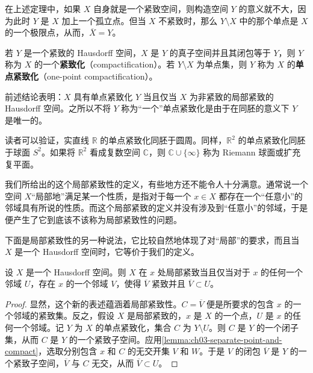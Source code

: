 在上述定理中，如果 $X$ 自身就是一个紧致空间，则构造空间 $Y$ 的意义就不大，因为此时 $Y$ 是 $X$ 加上一个孤立点。但当 $X$ 不紧致时，那么 $Y\setminus X$ 中的那个单点是 $X$ 的一个极限点，从而，$\overline{X}=Y$。

\begin{definition}\label{definition:ch03-compactification}
若 $Y$ 是一个紧致的 Hausdorff 空间，$X$ 是 $Y$ 的真子空间并且其闭包等于 $Y$，则 $Y$ 称为 $X$ 的一个\textbf{紧致化}（compactification）。若 $Y\setminus X$ 为单点集，则 $Y$ 称为 $X$ 的\textbf{单点紧致化}（one-point compactification）。
\end{definition}

前述结论表明：$X$ 具有单点紧致化 $Y$ 当且仅当 $X$ 为非紧致的局部紧致的 Hausdorff 空间。之所以不将 $Y$ 称为``一个''单点紧致化是由于在同胚的意义下 $Y$ 是唯一的。

\begin{example}\label{example:ch03-one-point-compact-examples}
读者可以验证，实直线 $\mathbb{R}$ 的单点紧致化同胚于圆周。同样，$\mathbb{R}^{2}$ 的单点紧致化同胚于球面 $S^{2}$。如果将 $\mathbb{R}^{2}$ 看成复数空间 $\mathbb{C}$，则 $\mathbb{C}\cup\{\infty\}$ 称为 Riemann 球面或扩充复平面。
\end{example}

我们所给出的这个局部紧致性的定义，有些地方还不能令人十分满意。通常说一个空间 $X$``局部地''满足某一个性质，是指对于每一个 $x\in X$ 都存在一个``任意小''的邻域具有所说的性质。而这个局部紧致的定义并没有涉及到``任意小''的邻域，于是便产生了它到底该不该称为局部紧致性的问题。

下面是局部紧致性的另一种说法，它比较自然地体现了对``局部''的要求，而且当 $X$ 是一个 Hausdorff 空间时，它等价于我们的定义。

\begin{theorem}\label{theorem:ch03-locally-compact-neighborhood}
设 $X$ 是一个 Hausdorff 空间。则 $X$ 在 $x$ 处局部紧致当且仅当对于 $x$ 的任何一个邻域 $U$，存在 $x$ 的一个邻域 $V$，使得 $\overline{V}$ 紧致并且 $\overline{V}\subset U$。
\end{theorem}

\begin{proof}
显然，这个新的表述蕴涵着局部紧致性。$C=\overline{V}$ 便是所要求的包含 $x$ 的一个邻域的紧致集。反之，假设 $X$ 是局部紧致的，$x$ 是 $X$ 的一个点，$U$ 是 $x$ 的任何一个邻域。记 $Y$ 为 $X$ 的单点紧致化，集合 $C$ 为 $Y\setminus U$。则 $C$ 是 $Y$ 的一个闭子集，从而 $C$ 是 $Y$ 的一个紧致子空间。应用\cref{lemma:ch03-separate-point-and-compact}，选取分别包含 $x$ 和 $C$ 的无交开集 $V$ 和 $W$。于是 $V$ 的闭包 $\overline{V}$ 是 $Y$ 的一个紧致子空间，$\overline{V}$ 与 $C$ 无交，从而 $\overline{V}\subset U$。
\end{proof}


